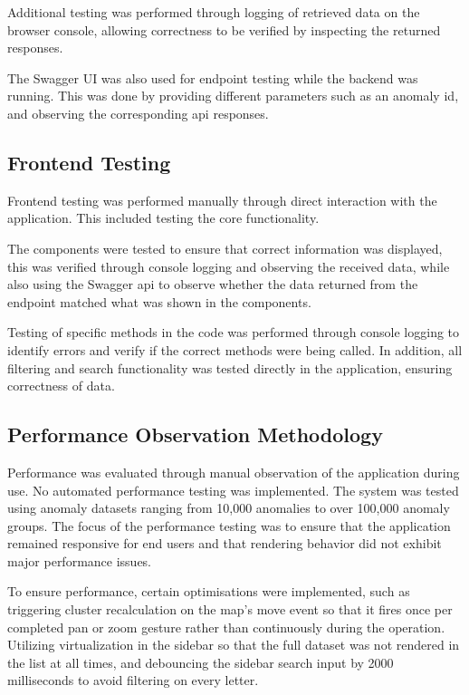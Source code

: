 Additional testing was performed through logging of retrieved data on the browser console, allowing correctness to be verified by inspecting the returned responses.

The Swagger UI was also used for endpoint testing while the backend was running. This was done by providing different parameters such as an anomaly \acrshort{id}, and observing the corresponding \acrshort{api} responses.


\subsection{Frontend Testing}

Frontend testing was performed manually through direct interaction with the application. This included testing the core functionality.

The components were tested to ensure that correct information was displayed, this was verified through console logging and observing the received data, while also using the Swagger \acrshort{api} to observe whether the data returned from the endpoint matched what was shown in the components.

Testing of specific methods in the code was performed through console logging to identify errors and verify if the correct methods were being called. In addition, all filtering and search functionality was tested directly in the application, ensuring correctness of data. 

\subsection{Performance Observation Methodology}

Performance was evaluated through manual observation of the application during use. No automated performance testing was implemented. The system was tested using anomaly datasets ranging from 10,000 anomalies to over 100,000 anomaly groups. The focus of the performance testing was to ensure that the application remained responsive for end users and that rendering behavior did not exhibit major performance issues.

To ensure performance, certain optimisations were implemented, such as triggering cluster recalculation on the map's move event so that it fires once per completed pan or zoom gesture rather than continuously during the operation. Utilizing virtualization in the sidebar so that the full dataset was not rendered in the list at all times, and debouncing the sidebar search input by 2000 milliseconds to avoid filtering on every letter.
